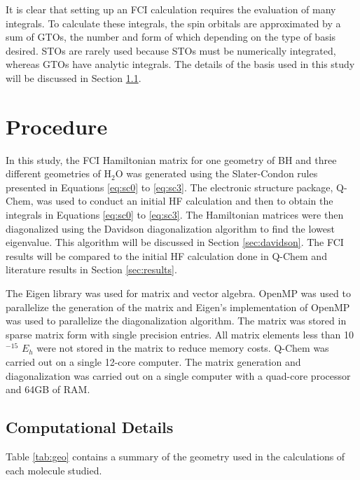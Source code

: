 \documentclass[final,3p,times,twocolumn]{elsarticle}
\begin{document}
It is clear that setting up an FCI calculation requires the evaluation of many integrals. To calculate these integrals, the spin orbitals are approximated by a sum of GTOs,\cite{gto} the number and form of which depending on the type of basis desired. STOs are rarely used because STOs must be numerically integrated, whereas GTOs have analytic integrals.\cite{szabo} The details of the basis used in this study will be discussed in Section \ref{sec:integrals}.

\section{Procedure}

In this study, the FCI Hamiltonian matrix for one geometry of BH and three different geometries of H$_2$O was generated using the Slater-Condon rules presented in Equations \eqref{eq:sc0} to \eqref{eq:sc3}. The electronic structure package, Q-Chem,\cite{qchem} was used to conduct an initial HF calculation and then to obtain the integrals in Equations \eqref{eq:sc0} to \eqref{eq:sc3}. The Hamiltonian matrices were then diagonalized using the Davidson diagonalization algorithm\cite{davidson,liu} to find the lowest eigenvalue. This algorithm will be discussed in Section \ref{sec:davidson}. The FCI results will be compared to the initial HF calculation done in Q-Chem and literature results\cite{handy-1983} in Section \ref{sec:results}.

The Eigen library was used for matrix and vector algebra.\cite{eigen} OpenMP was used to parallelize the generation of the matrix and Eigen's implementation of OpenMP was used to parallelize the diagonalization algorithm.\cite{openmp} The matrix was stored in sparse matrix form with single precision entries. All matrix elements less than 10$^{-15}$ $E_h$ were not stored in the matrix to reduce memory costs. Q-Chem was carried out on a single 12-core computer. The matrix generation and diagonalization was carried out on a single computer with a quad-core processor and 64GB of RAM.

\subsection{Computational Details} \label{sec:integrals}

Table \ref{tab:geo} contains a summary of the geometry used in the calculations of each molecule studied.
\end{document}
